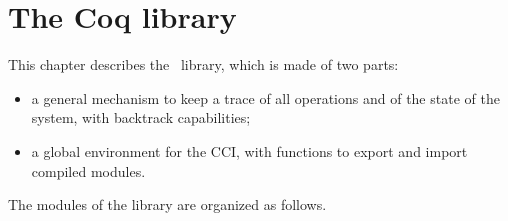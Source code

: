 
\newpage
\section*{The Coq library}

\ocwsection \label{library}
This chapter describes the \Coq\ library, which is made of two parts:
\begin{itemize}
  \item a general mechanism to keep a trace of all operations and of
    the state of the system, with backtrack capabilities;
  \item a global environment for the CCI, with functions to export and 
    import compiled modules.
\end{itemize}
The modules of the library are organized as follows.

\bigskip
\begin{center}\end{center}
